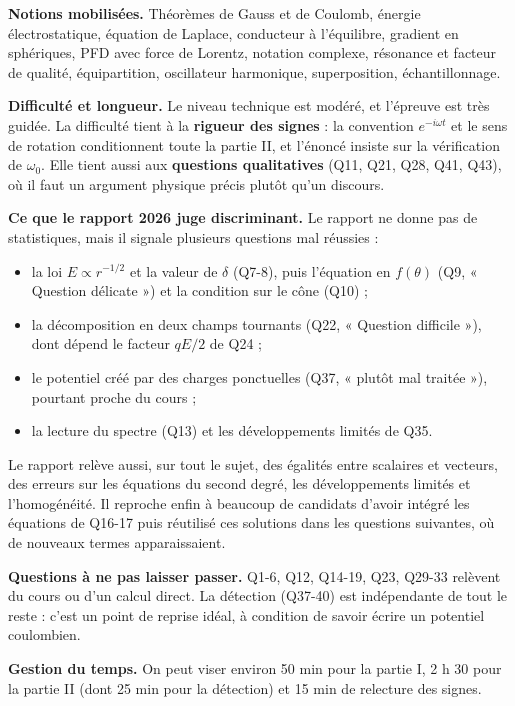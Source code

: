 \documentclass[11pt,a4paper]{article}
\providecommand{\tightlist}{\setlength{\itemsep}{0pt}\setlength{\parskip}{0pt}}
\begin{document}
\textbf{Notions mobilisées.} Théorèmes de Gauss et de Coulomb, énergie électrostatique, équation de Laplace, conducteur à l'équilibre, gradient en sphériques, PFD avec force de Lorentz, notation complexe, résonance et facteur de qualité, équipartition, oscillateur harmonique, superposition, échantillonnage.

\textbf{Difficulté et longueur.} Le niveau technique est modéré, et l'épreuve est très guidée. La difficulté tient à la \textbf{rigueur des signes} : la convention \(e^{-i\omega t}\) et le sens de rotation conditionnent toute la partie II, et l'énoncé insiste sur la vérification de \(\omega_0\). Elle tient aussi aux \textbf{questions qualitatives} (Q11, Q21, Q28, Q41, Q43), où il faut un argument physique précis plutôt qu'un discours.

\textbf{Ce que le rapport 2026 juge discriminant.} Le rapport ne donne pas de statistiques, mais il signale plusieurs questions mal réussies :

\begin{itemize}
\tightlist
\item
  la loi \(E\propto r^{-1/2}\) et la valeur de \(\delta\) (Q7-8), puis l'équation en \(f(\theta)\) (Q9, « Question délicate ») et la condition sur le cône (Q10) ;
\item
  la décomposition en deux champs tournants (Q22, « Question difficile »), dont dépend le facteur \(qE/2\) de Q24 ;
\item
  le potentiel créé par des charges ponctuelles (Q37, « plutôt mal traitée »), pourtant proche du cours ;
\item
  la lecture du spectre (Q13) et les développements limités de Q35.
\end{itemize}

Le rapport relève aussi, sur tout le sujet, des égalités entre scalaires et vecteurs, des erreurs sur les équations du second degré, les développements limités et l'homogénéité. Il reproche enfin à beaucoup de candidats d'avoir intégré les équations de Q16-17 puis réutilisé ces solutions dans les questions suivantes, où de nouveaux termes apparaissaient.

\textbf{Questions à ne pas laisser passer.} Q1-6, Q12, Q14-19, Q23, Q29-33 relèvent du cours ou d'un calcul direct. La détection (Q37-40) est indépendante de tout le reste : c'est un point de reprise idéal, à condition de savoir écrire un potentiel coulombien.

\textbf{Gestion du temps.} On peut viser environ 50 min pour la partie I, 2 h 30 pour la partie II (dont 25 min pour la détection) et 15 min de relecture des signes.
\end{document}
